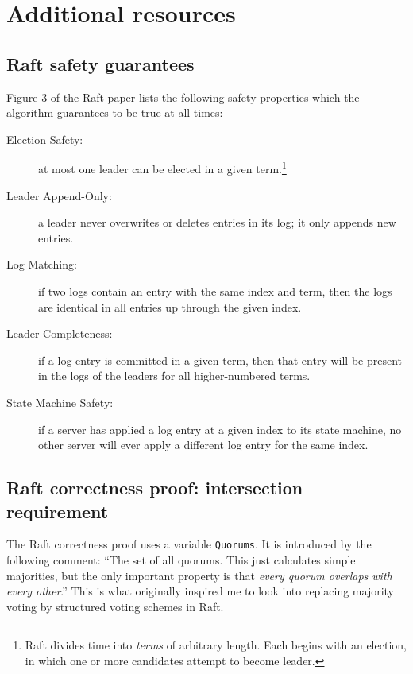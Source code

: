 \documentclass[12pt,chapterprefix=true,toc=bibliography,numbers=noendperiod,
               footnotes=multiple,twoside]{scrreprt}
\begin{document}

\printbibliography


\appendix



\chapter{Additional resources}

\section{Raft safety guarantees}
\label{sc:rafter-safety}

Figure 3 of the Raft paper lists the following safety properties which the algorithm guarantees to be true at all times:\autocite{raft}

\begin{description}
    \item[Election Safety:] at most one leader can be elected in a given term.\footnote{Raft divides time into \emph{terms} of arbitrary length. Each begins with an election, in which one or more candidates attempt to become leader.}
    \item[Leader Append-Only:] a leader never overwrites or deletes entries in its log; it only appends new entries.
    \item[Log Matching:] if two logs contain an entry with the same index and term, then the logs are identical in all entries up through the given index.
    \item[Leader Completeness:] if a log entry is committed in a given term, then that entry will be present in the logs of the leaders for all higher-numbered terms.
    \item[State Machine Safety:] if a server has applied a log entry at a given index to its state machine, no other server will ever apply a different log entry for the same index.
\end{description}

\section{Raft correctness proof: intersection requirement}
\label{sc:rafter-proof}

The Raft correctness proof uses a variable \texttt{Quorums}. It is introduced by the following comment: \enquote{The set of all quorums. This just calculates simple majorities, but the only important property is that \emph{every quorum overlaps with every other}.} This is what originally inspired me to look into replacing majority voting by structured voting schemes in Raft.
\end{document}
